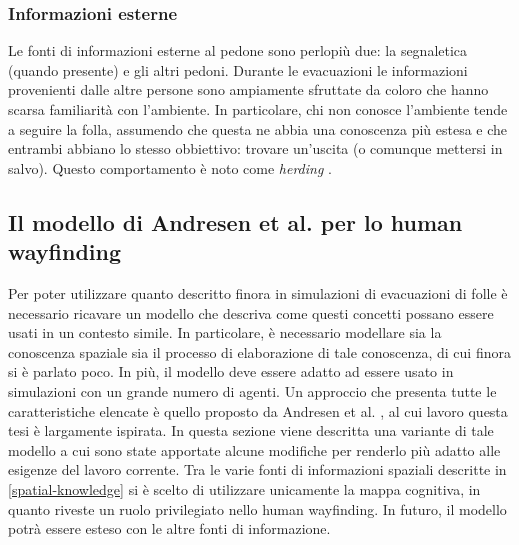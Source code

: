 \documentclass[12pt,a4paper,openright,oneside]{book}
\begin{document}
\subsubsection{Informazioni esterne} 
Le fonti di informazioni esterne al pedone sono perlopiù due: la segnaletica (quando presente) e gli altri pedoni. Durante le evacuazioni le informazioni provenienti dalle altre persone sono ampiamente sfruttate da coloro che hanno scarsa familiarità con l’ambiente. In particolare, chi non conosce l’ambiente tende a seguire la folla, assumendo che questa ne abbia una conoscenza più estesa e che entrambi abbiano lo stesso obbiettivo: trovare un’uscita (o comunque mettersi in salvo). Questo comportamento è noto come \emph{herding} \cite{Helbing2002}.

\subsection{Il modello di Andresen et al. per lo human wayfinding}
Per poter utilizzare quanto descritto finora in  simulazioni di evacuazioni di folle è necessario ricavare un modello che descriva come questi concetti possano essere usati in un contesto simile. In particolare, è necessario modellare sia la conoscenza spaziale sia il processo di elaborazione di tale conoscenza, di cui finora si è parlato poco. In più, il modello deve essere adatto ad essere usato in simulazioni con un grande numero di agenti. Un approccio che presenta tutte le caratteristiche elencate è quello proposto da Andresen et al. \cite{Andresen2018}, al cui lavoro questa tesi è largamente ispirata. In questa sezione viene descritta una variante di tale modello a cui sono state apportate alcune modifiche per renderlo più adatto alle esigenze del lavoro corrente. Tra le varie fonti di informazioni spaziali descritte in \ref{spatial-knowledge} si è scelto di utilizzare unicamente la mappa cognitiva, in quanto riveste un ruolo privilegiato nello human wayfinding. In futuro, il modello potrà essere esteso con le altre fonti di informazione.
\end{document}
